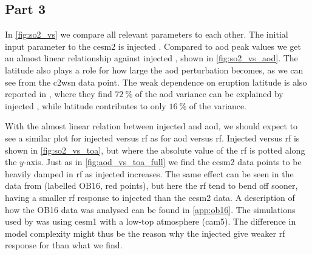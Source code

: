 \documentclass{ametsocV5}
\newcommand{\iso}[1][i]{{#1}njected \ce{SO2}}
\begin{document}
%

\subsection{Part 3}

In \cref{fig:so2_vs} we compare all relevant parameters to each other. The initial input
parameter to the \ac{cesm2} is injected . Compared to \ac{aod} peak values we
get an almost linear relationship against \iso{}, shown in \cref{fig:so2_vs_aod}. The
latitude also plays a role for how large the \ac{aod} perturbation becomes, as we can
see from the \ac{c2wsn} data point. The weak dependence on eruption latitude is also
reported in \citet{marshall2019}, where they find \(\SI{72}{\percent}\) of the \ac{aod}
variance can be explained by \iso{}, while latitude contributes to only
\(\SI{16}{\percent}\) of the variance.


With the almost linear relation between injected  and \ac{aod}, we should expect
to see a similar plot for \iso{} versus \ac{rf} as for \ac{aod} versus \ac{rf}. \iso[I]
versus \ac{rf} is shown in \cref{fig:so2_vs_toa}, but where the absolute value of the
\ac{rf} is potted along the \(y\)-axis. Just as in \cref{fig:aod_vs_toa_full} we find
the \ac{cesm2} data points to be heavily damped in \ac{rf} as \iso{} increases. The same
effect can be seen in the data from \citet{ottobliesner2016} (labelled OB16, red
points), but here the \ac{rf} tend to bend off sooner, having a smaller \ac{rf} response
to \iso{} than the \ac{cesm2} data. A description of how the OB16 data was analysed can
be found in \cref{app:ob16}. The simulations used by \citet{ottobliesner2016} was using
\ac{cesm1} with a low-top atmosphere (\ac{cam5}). The difference in model complexity
might thus be the reason why the \iso{} give weaker \ac{rf} response for
\citet{ottobliesner2016} than what we find.
\end{document}
